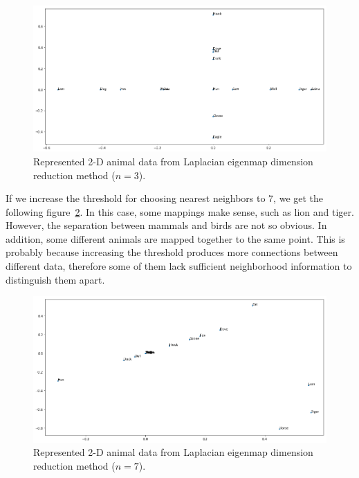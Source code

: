 \documentclass{article}
\begin{document}
\begin{figure}[h!]
\centering
\includegraphics[width=0.6\linewidth]{../images/4_n=3.png}
\caption{Represented 2-D animal data from Laplacian eigenmap dimension reduction method ($n=3$).}
\label{fig:4_n=3}
\end{figure}

If we increase the threshold for choosing nearest neighbors to 7, we get the following figure~\ref{fig:4_n=7}. In this case, some mappings make sense, such as lion and tiger. However, the separation between mammals and birds are not so obvious. In addition, some different animals are mapped together to the same point. This is probably because increasing the threshold produces more connections between different data, therefore some of them lack sufficient neighborhood information to distinguish them apart.

\begin{figure}[h!]
\centering
\includegraphics[width=0.6\linewidth]{../images/4_n=7.png}
\caption{Represented 2-D animal data from Laplacian eigenmap dimension reduction method ($n=7$).}
\label{fig:4_n=7}
\end{figure}
\end{document}
